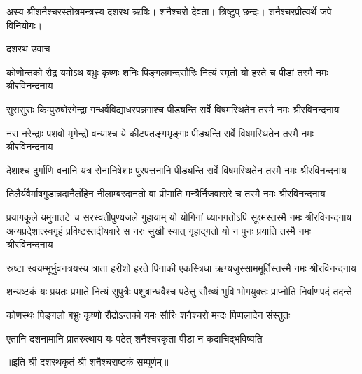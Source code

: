 

अस्य श्रीशनैश्चरस्तोत्रमन्त्रस्य दशरथ ऋषिः। शनैश्चरो देवता। त्रिष्टुप् छन्दः। शनैश्चरप्रीत्यर्थे जपे विनियोगः।

दशरथ उवाच

\twolineshloka
{कोणोन्तको रौद्र यमोऽथ बभ्रुः कृष्णः शनिः पिङ्गलमन्दसौरिः}
{नित्यं स्मृतो यो हरते च पीडां तस्मै नमः श्रीरविनन्दनाय}

\twolineshloka
{सुरासुराः किम्पुरुषोरगेन्द्रा गन्धर्वविद्याधरपन्नगाश्च}
{पीड्यन्ति सर्वे विषमस्थितेन तस्मै नमः श्रीरविनन्दनाय}

\twolineshloka
{नरा नरेन्द्राः पशवो मृगेन्द्रो वन्याश्च ये कीटपतङ्गभृङ्गाः}
{पीड्यन्ति सर्वे विषमस्थितेन तस्मै नमः श्रीरविनन्दनाय }

\twolineshloka
{देशाश्च दुर्गाणि वनानि यत्र सेनानिषेशाः पुरपत्तनानि}
{पीड्यन्ति सर्वे विषमस्थितेन तस्मै नमः श्रीरविनन्दनाय }

\twolineshloka
{तिलैर्यवैर्माषगुडान्नदानैर्लोहेन नीलाम्बरदानतो वा}
{प्रीणाति मन्त्रैर्निजवासरे च तस्मै नमः श्रीरविनन्दनाय }

\twolineshloka
{प्रयागकूले यमुनातटे च सरस्वतीपुण्यजले गुहायाम्}
{यो योगिनां ध्यानगतोऽपि सूक्ष्मस्तस्मै नमः श्रीरविनन्दनाय}
\twolineshloka
{अन्यप्रदेशात्स्वगृहं प्रविष्टस्तदीयवारे स नरः सुखी स्यात्}
{गृहाद्गतो यो न पुनः प्रयाति तस्मै नमः श्रीरविनन्दनाय}

\twolineshloka
{स्रष्टा स्वयम्भूर्भुवनत्रयस्य त्राता हरीशो हरते पिनाकी}
{एकस्त्रिधा ऋग्यजुस्साममूर्तिस्तस्मै नमः श्रीरविनन्दनाय}

\twolineshloka
{शन्यष्टकं यः प्रयतः प्रभाते नित्यं सुपुत्रैः पशुबान्धवैश्च}
{पठेत्तु सौख्यं भुवि भोगयुक्तः प्राप्नोति निर्वाणपदं तदन्ते}

\twolineshloka
{कोणस्थः पिङ्गलो बभ्रुः कृष्णो रौद्रोऽन्तको यमः}
{सौरिः शनैश्चरो मन्दः पिप्पलादेन संस्तुतः}

\twolineshloka
{एतानि दशनामानि प्रातरुत्थाय यः पठेत्}
{शनैश्चरकृता पीडा न कदाचिद्भविष्यति}

॥इति श्री दशरथकृतं श्री शनैश्चराष्टकं सम्पूर्णम्॥

